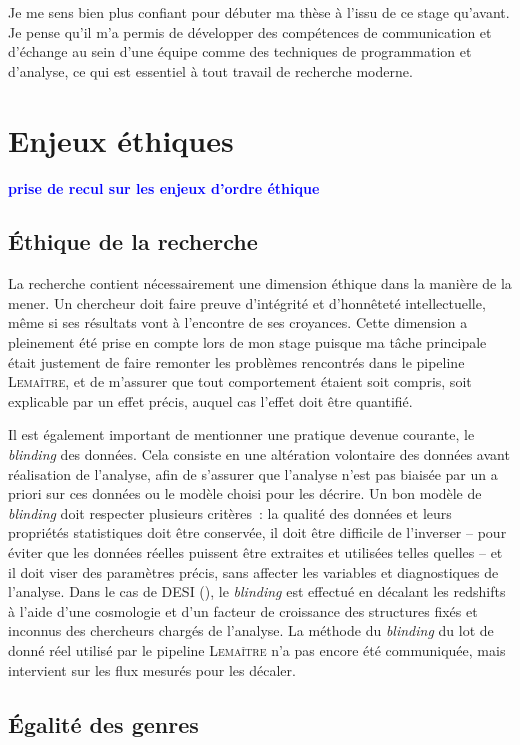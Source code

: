 \documentclass{book}
\newcommand{\consignes}[1]{{\textcolor{blue}{\bf \large #1}}}
\def\lemaitre{\textsc{Lemaître}\xspace}
\begin{document}
Je me sens bien plus confiant pour débuter ma thèse à l'issu de ce stage qu'avant. Je pense qu'il m'a permis de développer des compétences de communication et d'échange au sein d'une équipe comme des techniques de programmation et d'analyse, ce qui est essentiel à tout travail de recherche moderne.


\chapter{Enjeux éthiques}
\consignes{prise de recul sur les enjeux d’ordre éthique}

\section{Éthique de la recherche}

La recherche contient nécessairement une dimension éthique dans la manière de la mener. Un chercheur doit faire preuve d'intégrité et d'honnêteté intellectuelle, même si ses résultats vont à l'encontre de ses croyances. Cette dimension a pleinement été prise en compte lors de mon stage puisque ma tâche principale était justement de faire remonter les problèmes rencontrés dans le pipeline \lemaitre, et de m'assurer que tout comportement étaient soit compris, soit explicable par un effet précis, auquel cas l'effet doit être quantifié.

Il est également important de mentionner une pratique devenue courante, le \textit{blinding} des données. Cela consiste en une altération volontaire des données avant réalisation de l'analyse, afin de s'assurer que l'analyse n'est pas biaisée par un a priori sur ces données ou le modèle choisi pour les décrire. Un bon modèle de \textit{blinding} doit respecter plusieurs critères~: la qualité des données et leurs propriétés statistiques doit être conservée, il doit être difficile de l'inverser -- pour éviter que les données réelles puissent être extraites et utilisées telles quelles -- et il doit viser des paramètres précis, sans affecter les variables et diagnostiques de l'analyse. Dans le cas de DESI (\cite{andrade_validating_2024}), le \textit{blinding} est effectué en décalant les redshifts à l'aide d'une cosmologie et d'un facteur de croissance des structures fixés et inconnus des chercheurs chargés de l'analyse. La méthode du \textit{blinding} du lot de donné réel utilisé par le pipeline \lemaitre n'a pas encore été communiquée, mais intervient sur les flux mesurés pour les décaler.

\section{Égalité des genres}
\end{document}
